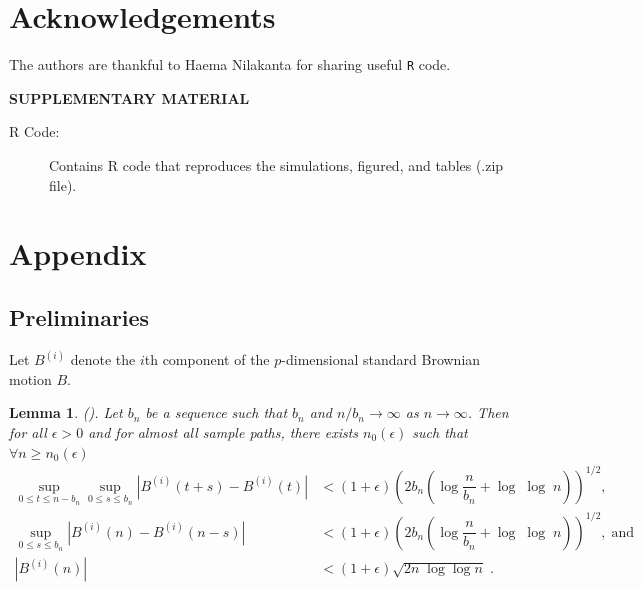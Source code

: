 \documentclass[12pt]{article}
\newtheorem{lemma}{Lemma}
\theoremstyle{remark}
\begin{document}
\section{Acknowledgements} %
\label{sec:acknowledgements}
The authors are thankful to Haema Nilakanta for sharing useful \texttt{R} code.

\bigskip
\begin{center}
{\large\bf SUPPLEMENTARY MATERIAL}
\end{center}

\begin{description}


\item[R Code:] Contains R code that reproduces the simulations, figured, and tables (.zip file).

\end{description}


\appendix
\section{Appendix}  \label{sec:appendix}
\subsection{Preliminaries} \label{apdx:preliminaries}

Let $B^{(i)}$ denote the $i$th component of the $p$-dimensional standard Brownian motion $B$.
\begin{lemma}
\label{lemma: brownian}
(\cite{csorgo1981strong}). Let $b_n$ be a sequence such that $b_n$ and $n/b_n \to \infty$ as $n \to \infty$. Then for all $\epsilon > 0$ and for almost all sample paths, there exists $n_{0}\left(\epsilon\right)$ such that $\forall n\geq n_{0}(\epsilon)$
\begin{align*}
 \sup_{0\leq t \leq n-b_n}\sup_{0 \leq s \leq b_n} \left| B^{\left(i\right)}\left(t+s\right) - B^{\left(i\right)}\left(t\right) \right| & < \left(1+ \epsilon\right)\left(2b_n\left(\log\dfrac{n}{b_n} + \log\; \log\; n\right)\right)^{1/2} , \\ 
  \sup_{0 \leq s \leq b_n} \left|B^{\left(i\right)}\left(n\right) - B^{\left(i\right)}\left(n - s\right)\right|& < \left(1+ \epsilon\right)\left(2b_n\left(\log\dfrac{n}{b_n} + \log\;\log\;n\right)\right)^{1/2} , \; \textrm{and} \\ 
  \left|B^{\left(i\right)}\left(n\right)\right|& < \left(1+\epsilon\right)\sqrt{2n\;\log \log n} \; . 
\end{align*}
%
\end{lemma}
\end{document}
